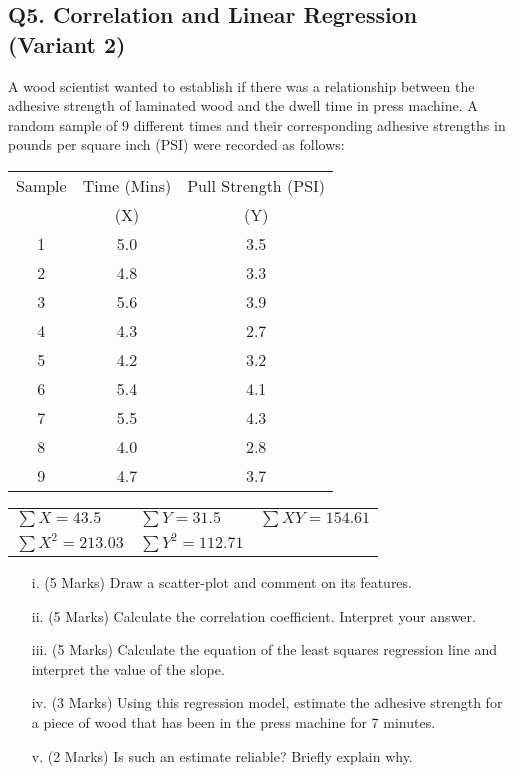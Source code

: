 \documentclass[a4paper,12pt]{article}
\begin{document}
\newpage
\subsection*{Q5. Correlation and Linear Regression (Variant 2)}

A wood scientist wanted to establish if there was a relationship between the adhesive strength of laminated wood and the dwell time in press machine. A random sample of 9 different times and their corresponding adhesive strengths in pounds per square inch (PSI) were recorded as follows:

\begin{center}
\begin{tabular}{|c|c|c|}

  \hline
Sample &Time (Mins) & Pull Strength (PSI) \\
 & (X)  &  (Y)\\ \hline
1& 5.0& 3.5 \\
2& 4.8& 3.3\\
3& 5.6& 3.9\\
4& 4.3& 2.7\\
5& 4.2& 3.2\\
6& 5.4& 4.1\\
7& 5.5& 4.3\\
8& 4.0& 2.8\\
9& 4.7& 3.7\\
  \hline
\end{tabular}
\bigskip

\begin{tabular}{lll}
  $\sum X = 43.5$ & $\sum Y = 31.5$ & $\sum XY = 154.61$ \\
  $\sum X^2 = 213.03$ & $\sum Y^2 = 112.71$ &  \\
 \end{tabular}
 \end{center}
\begin{itemize}
\item[i.](5 Marks) Draw a scatter-plot and comment on its features.
\item[ii.](5 Marks) Calculate the correlation coefficient. Interpret your answer.
\item[iii.](5 Marks) Calculate the equation of the least squares regression line and interpret the value of the slope.
\item[iv.](3 Marks) Using this regression model, estimate the adhesive strength for a piece of wood that has been in the press machine for 7 minutes.
\item[v.](2 Marks) Is such an estimate reliable? Briefly explain why.
\end{itemize}
\newpage
\end{document}
